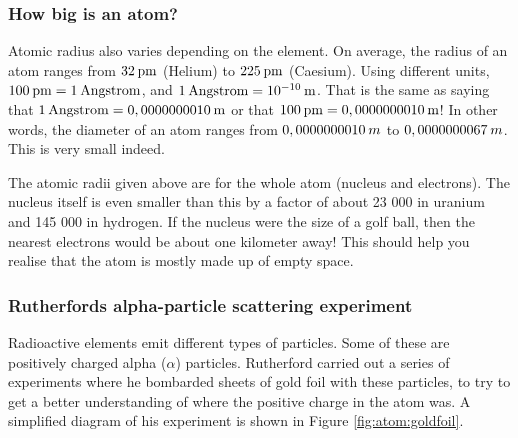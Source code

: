             \subsubsection{ How big is an atom?}
            \nopagebreak
\label{m38756*notfhsst!!!underscore!!!id177}
	

\label{m38756*id255173}Atomic radius also varies depending on the element. On average, the radius of an atom ranges from $32\phantom{\rule{2pt}{0ex}}\mathrm{pm}$ (Helium) to $225\phantom{\rule{2pt}{0ex}}\mathrm{pm}$ (Caesium). Using different units, $100\phantom{\rule{2pt}{0ex}}\mathrm{pm}=1\phantom{\rule{2pt}{0ex}}\mathrm{Angstrom}$, and $1\phantom{\rule{2pt}{0ex}}\mathrm{Angstrom}={10}^{-10}\phantom{\rule{2pt}{0ex}}\mathrm{m}$. That is the same as saying that $1\phantom{\rule{2pt}{0ex}}\mathrm{Angstrom}=0,0000000010\phantom{\rule{2pt}{0ex}}\mathrm{m}$ or that $100\phantom{\rule{2pt}{0ex}}\mathrm{pm}=0,0000000010\phantom{\rule{2pt}{0ex}}\mathrm{m}$! In other words, the diameter of an atom ranges from $0,0000000010\phantom{\rule{2pt}{0ex}}m$ to $0,0000000067\phantom{\rule{2pt}{0ex}}m$. This is very small indeed.\par \label{m38756*eip-30}The atomic radii given above are for the whole atom (nucleus and electrons). The nucleus itself is even smaller than this by a factor of about 23 000 in uranium and 145 000 in hydrogen. If the nucleus were the size of a golf ball, then the nearest electrons would be about one kilometer away! This should help you realise that the atom is mostly made up of empty space. \par \label{m38756*eip-320}
            \subsubsection{ Rutherfords alpha-particle scattering experiment}
            \nopagebreak
            \label{m38756*id254668}Radioactive elements emit different types of particles. Some of these are positively charged alpha ($\alpha $) particles.
Rutherford carried out a series of experiments where he bombarded sheets of gold foil with these particles, to try to get a better understanding of where the positive charge in the atom was. A simplified diagram of his experiment is shown in Figure \ref{fig:atom:goldfoil}.\par 

